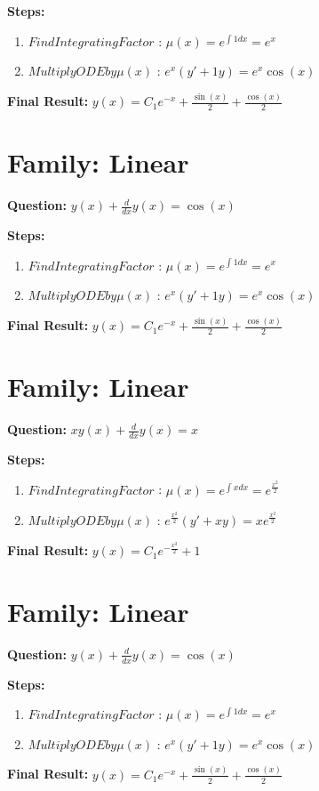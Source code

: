 \documentclass{article}
\begin{document}
\textbf{Steps:}
\begin{enumerate}
\item $Find Integrating Factor$ :  $\mu(x) = e^{\int 1 dx} = e^{x}$
\item $Multiply ODE by \mu(x)$ :  $e^{x}(y' + 1y) = e^{x} \cos{\left(x \right)}$
\end{enumerate}
\textbf{Final Result:} $y{\left(x \right)} = C_{1} e^{- x} + \frac{\sin{\left(x \right)}}{2} + \frac{\cos{\left(x \right)}}{2}$

\section*{Family: Linear}
\textbf{Question:} $y{\left(x \right)} + \frac{d}{d x} y{\left(x \right)} = \cos{\left(x \right)}$

\textbf{Steps:}
\begin{enumerate}
\item $Find Integrating Factor$ :  $\mu(x) = e^{\int 1 dx} = e^{x}$
\item $Multiply ODE by \mu(x)$ :  $e^{x}(y' + 1y) = e^{x} \cos{\left(x \right)}$
\end{enumerate}
\textbf{Final Result:} $y{\left(x \right)} = C_{1} e^{- x} + \frac{\sin{\left(x \right)}}{2} + \frac{\cos{\left(x \right)}}{2}$

\section*{Family: Linear}
\textbf{Question:} $x y{\left(x \right)} + \frac{d}{d x} y{\left(x \right)} = x$

\textbf{Steps:}
\begin{enumerate}
\item $Find Integrating Factor$ :  $\mu(x) = e^{\int x dx} = e^{\frac{x^{2}}{2}}$
\item $Multiply ODE by \mu(x)$ :  $e^{\frac{x^{2}}{2}}(y' + xy) = x e^{\frac{x^{2}}{2}}$
\end{enumerate}
\textbf{Final Result:} $y{\left(x \right)} = C_{1} e^{- \frac{x^{2}}{2}} + 1$

\section*{Family: Linear}
\textbf{Question:} $y{\left(x \right)} + \frac{d}{d x} y{\left(x \right)} = \cos{\left(x \right)}$

\textbf{Steps:}
\begin{enumerate}
\item $Find Integrating Factor$ :  $\mu(x) = e^{\int 1 dx} = e^{x}$
\item $Multiply ODE by \mu(x)$ :  $e^{x}(y' + 1y) = e^{x} \cos{\left(x \right)}$
\end{enumerate}
\textbf{Final Result:} $y{\left(x \right)} = C_{1} e^{- x} + \frac{\sin{\left(x \right)}}{2} + \frac{\cos{\left(x \right)}}{2}$
\end{document}
